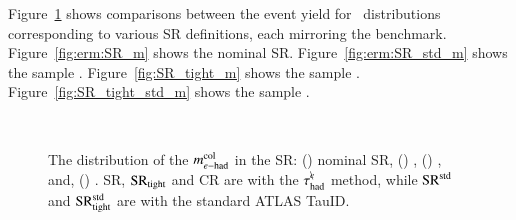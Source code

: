         Figure~\ref{fig:erm:SRcmp} shows comparisons between the event yield for 
        \mcolEtau\ distributions corresponding to various SR definitions,
        each mirroring the \tauhadmurm benchmark. 
        Figure~\ref{fig:erm:SR_m} shows the nominal SR. 
        Figure~\ref{fig:erm:SR_std_m} shows the sample \SRstd. 
        Figure~\ref{fig:SR_tight_m} shows the sample \SRtight.
        Figure~\ref{fig:SR_tight_std_m} shows the sample \SRtightstd.
        \begin{figure}[!tb]
            \centering
            \\
            \caption{
                The distribution of the $m_{e\mathrm{-}\mathrm{had}}^\mathrm{col}$ in the SR: (\protect{}) nominal SR, 
                (\protect{}) \SRstd, 
                (\protect{}) \SRtight, and,
                (\protect{}) \SRtightstd. 
                SR, $\mathrm{SR}_\mathrm{tight}$ and CR are with the $\tau_\mathrm{had}^{e\mkern-9mu\backslash}$ method, while $\mathrm{SR}^\mathrm{std}$ and $\mathrm{SR}_\mathrm{tight}^\mathrm{std}$ are with the standard ATLAS TauID.
            }
            \label{fig:erm:SRcmp}
        \end{figure}

